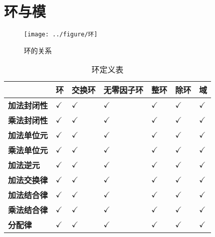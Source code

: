 % 

% 
	
\chapter{环与模}

\begin{figure}[H]
	\centering
	\texttt{[image: ../figure/环]}
	\caption{环的关系}
\end{figure}

\begin{table}[H]
	\centering
	\caption{环定义表}
	\begin{tabular}{|>{\centering\arraybackslash}m{2cm}|>{\centering\arraybackslash}m{2cm}|>{\centering\arraybackslash}m{2cm}|>{\centering\arraybackslash}m{2cm}|>{\centering\arraybackslash}m{2cm}|>{\centering\arraybackslash}m{2cm}|>{\centering\arraybackslash}m{2cm}|}
		\hline
		&      \textbf{环}      &    \textbf{交换环}    &  \textbf{无零因子环}  &     \textbf{整环}     &     \textbf{除环}     &      \textbf{域}      \\
		\hline
		\textbf{加法封闭性} & $\checkmark$ & $\checkmark$ & $\checkmark$ & $\checkmark$ & $\checkmark$ & $\checkmark$ \\
		\hline
		\textbf{乘法封闭性} & $\checkmark$ & $\checkmark$ & $\checkmark$ & $\checkmark$ & $\checkmark$ & $\checkmark$ \\
		\hline
		\textbf{加法单位元} & $\checkmark$ & $\checkmark$ & $\checkmark$ & $\checkmark$ & $\checkmark$ & $\checkmark$ \\
		\hline
		\textbf{乘法单位元} & $\checkmark$ & $\checkmark$ & $\checkmark$ & $\checkmark$ & $\checkmark$ & $\checkmark$ \\
		\hline
		\textbf{加法逆元}   & $\checkmark$ & $\checkmark$ & $\checkmark$ & $\checkmark$ & $\checkmark$ & $\checkmark$ \\
		\hline
		\textbf{加法交换律} & $\checkmark$ & $\checkmark$ & $\checkmark$ & $\checkmark$ & $\checkmark$ & $\checkmark$ \\
		\hline
		\textbf{加法结合律} & $\checkmark$ & $\checkmark$ & $\checkmark$ & $\checkmark$ & $\checkmark$ & $\checkmark$ \\
		\hline
		\textbf{乘法结合律} & $\checkmark$ & $\checkmark$ & $\checkmark$ & $\checkmark$ & $\checkmark$ & $\checkmark$ \\
		\hline
		\textbf{分配律}     & $\checkmark$ & $\checkmark$ & $\checkmark$ & $\checkmark$ & $\checkmark$ & $\checkmark$ \\

\end{tabular}
\end{table}
